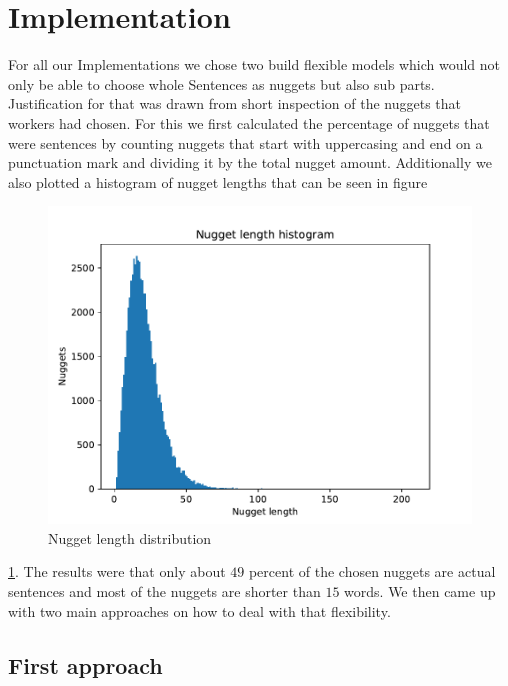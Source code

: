\documentclass{article}
\begin{document}


\section{Implementation}
\label{headings}


For all our Implementations we chose two build flexible models which would not only be able to choose whole Sentences as nuggets but also sub parts. Justification for that was drawn from short inspection of the nuggets that workers had chosen. For this we first calculated the percentage of nuggets that were sentences by counting nuggets that start with uppercasing and end on a punctuation mark and dividing it by the total nugget amount. Additionally we also plotted a histogram of nugget lengths that can be seen in figure
\begin{figure}[!ht]
	\centering
	\includegraphics[width=0.55\linewidth]{Nugget_size.pdf}
	\caption{Nugget length distribution}
	\label{fig:nuggets}
\end{figure}
\ref{fig:nuggets}.
The results were that only about $49$ percent of the chosen nuggets are actual sentences and most of the nuggets are shorter than $15$ words. We then came up with two main approaches on how to deal with that flexibility.

\subsection{First approach}
\end{document}
